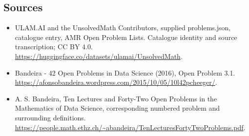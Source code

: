 \documentclass[11pt,a4paper]{article}
\begin{document}
\subsection{Sources}
\begin{itemize}
\item[S1] ULAM.AI and the UnsolvedMath Contributors, supplied problems.json, catalogue entry, AMR Open Problem Lists. Catalogue identity and source transcription; CC BY 4.0.
\url{https://huggingface.co/datasets/ulamai/UnsolvedMath}.
\item[S2] Bandeira - 42 Open Problems in Data Science (2016), Open Problem 3.1. 
\url{https://afonsobandeira.wordpress.com/2015/10/05/10l42pcheeger/}.
\item[S3] A. S. Bandeira, Ten Lectures and Forty-Two Open Problems in the Mathematics of Data Science, corresponding numbered problem and surrounding definitions.
\url{https://people.math.ethz.ch/~abandeira/TenLecturesFortyTwoProblems.pdf}.
\end{itemize}
\end{document}
